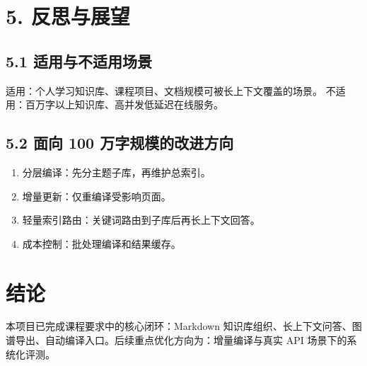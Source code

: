 \documentclass[UTF8]{ctexart}
\begin{document}
\section{5. 反思与展望}
\subsection{5.1 适用与不适用场景}
适用：个人学习知识库、课程项目、文档规模可被长上下文覆盖的场景。\newline
不适用：百万字以上知识库、高并发低延迟在线服务。

\subsection{5.2 面向 100 万字规模的改进方向}
\begin{enumerate}[leftmargin=1.5em]
\item 分层编译：先分主题子库，再维护总索引。
\item 增量更新：仅重编译受影响页面。
\item 轻量索引路由：关键词路由到子库后再长上下文回答。
\item 成本控制：批处理编译和结果缓存。
\end{enumerate}

\section{结论}
本项目已完成课程要求中的核心闭环：Markdown 知识库组织、长上下文问答、图谱导出、自动编译入口。后续重点优化方向为：增量编译与真实 API 场景下的系统化评测。
\end{document}
